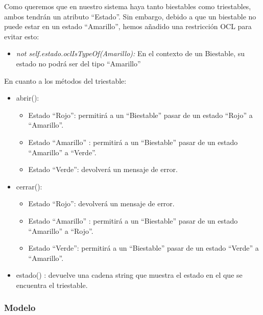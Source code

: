 \documentclass[11pt,a4paper]{article}
\begin{document}
Como queremos que en nuestro sistema haya tanto biestables como triestables, ambos tendrán un atributo ``Estado''. Sin embargo, debido a que un biestable no puede estar en un estado ``Amarillo'', hemos añadido una restricción OCL para evitar esto:

\begin{itemize}
\item \emph{not self.estado.oclIsTypeOf(Amarillo):} En el contexto de un Biestable, su estado no podrá ser del tipo ``Amarillo''
\end{itemize}


En cuanto a los métodos del triestable:

\begin{itemize}
\item abrir():

	\begin{itemize}
	\item Estado ``Rojo'': permitirá a un ``Biestable'' pasar de un estado ``Rojo'' a ``Amarillo''.
	\item Estado ``Amarillo'' : permitirá a un ``Biestable'' pasar de un estado ``Amarillo'' a ``Verde''.

	\item Estado ``Verde'': devolverá un mensaje de error.
	\end{itemize}
	
\item cerrar():

	\begin{itemize}
	\item Estado ``Rojo'': devolverá un mensaje de error.
	\item Estado ``Amarillo'' : permitirá a un ``Biestable'' pasar de un estado ``Amarillo'' a ``Rojo''.
	\item Estado ``Verde'':  permitirá a un ``Biestable'' pasar de un estado ``Verde'' a ``Amarillo''.

	\end{itemize}
	
\item estado() : devuelve una cadena string que muestra el estado en el que se encuentra el triestable.
\end{itemize}

\subsubsection{Modelo}
\end{document}
